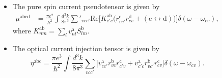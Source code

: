 \documentclass{beamer}
\begin{document}


{

\begin{frame}[noframenumbering]

\begin{columns}


\begin{itemize}

\item 
The pure spin current pseudotensor is given by 
\begin{align}\label{9.e}
\mu^{\mathrm{abcd}}
&=
\frac{\pi e^2}{\hbar^2}
\int\frac{d^3k}{8\pi^3}
\sum'_{vcc'}
\mathrm{Re}\Big[ 
K^{\mathrm{ab}}_{c'c}
\Big( 
r^\mathrm{c}_{vc'} r^\mathrm{d}_{cv}
+
(\mathrm{c} \leftrightarrow \mathrm{d}) 
\Big) 
\Big]
\delta(\omega-\omega_{cv}) 
,  
\end{align}
where $K^{\mathrm{ab}}_{nm}=\sum_l v^\mathrm{a}_{nl} S^\mathrm{b} _{lm} $.

\item 
The optical current injection tensor is given by
\begin{equation}
\eta^{\mathrm{abc}}
=
\frac{\pi e^3}{\hbar^2}
\int\frac{d^3k}{8\pi^3}
\sum_{vcc'}
\Big[ 
v^\mathrm{a}_{cc'}r^\mathrm{b}_{vc} r^\mathrm{c}_{c'v}
+ 
v^\mathrm{a}_{c'c}r^\mathrm{b}_{vc'} r^\mathrm{c}_{cv}
\Big]
\delta(\omega-\omega_{cv})
.
\end{equation} 


\end{itemize}

\end{columns}

\end{frame}

}


\end{document}
